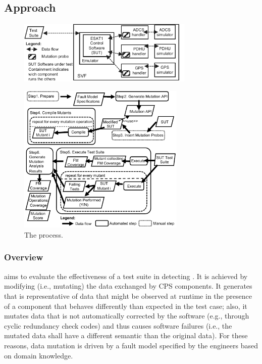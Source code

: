 
\subsection{Approach}

\begin{figure}[tb]
	\centering
		\includegraphics[width=8.4cm]{damat/images/dataMutationExample}
		\caption{}
		\label{fig:appr:mutateProbesInserted}
	\end{figure}

\begin{figure}[tb]
	\centering
		\includegraphics[width=8cm]{damat/images/dataDrivenBufferProcess}
		\caption{The \APPR process.}
		\label{fig:appr:approach}
	\end{figure}

\subsubsection{Overview}


 aims to evaluate the effectiveness of a test suite in detecting .
It is achieved by modifying (i.e., mutating) the data exchanged by CPS components. It generates  that is representative of data that might be observed at runtime in the presence of a component that behaves differently than expected in the test case; also, it mutates  data that is not automatically corrected by the software
(e.g., through cyclic redundancy check codes)
and thus causes software failures (i.e., the mutated data shall have a different semantic than the original data). For these reasons, data mutation is driven by a fault model specified by the engineers based on domain knowledge.

